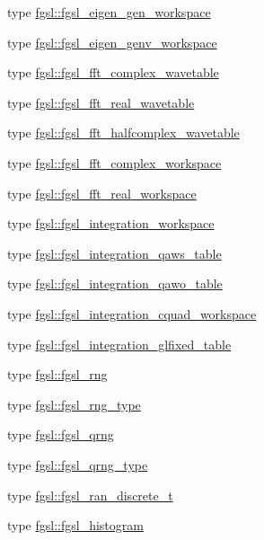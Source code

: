 \begin{DoxyCompactItemize}
\item 
type \hyperlink{structfgsl_1_1fgsl__eigen__gen__workspace}{fgsl\-::fgsl\-\_\-eigen\-\_\-gen\-\_\-workspace}
\item 
type \hyperlink{structfgsl_1_1fgsl__eigen__genv__workspace}{fgsl\-::fgsl\-\_\-eigen\-\_\-genv\-\_\-workspace}
\item 
type \hyperlink{structfgsl_1_1fgsl__fft__complex__wavetable}{fgsl\-::fgsl\-\_\-fft\-\_\-complex\-\_\-wavetable}
\item 
type \hyperlink{structfgsl_1_1fgsl__fft__real__wavetable}{fgsl\-::fgsl\-\_\-fft\-\_\-real\-\_\-wavetable}
\item 
type \hyperlink{structfgsl_1_1fgsl__fft__halfcomplex__wavetable}{fgsl\-::fgsl\-\_\-fft\-\_\-halfcomplex\-\_\-wavetable}
\item 
type \hyperlink{structfgsl_1_1fgsl__fft__complex__workspace}{fgsl\-::fgsl\-\_\-fft\-\_\-complex\-\_\-workspace}
\item 
type \hyperlink{structfgsl_1_1fgsl__fft__real__workspace}{fgsl\-::fgsl\-\_\-fft\-\_\-real\-\_\-workspace}
\item 
type \hyperlink{structfgsl_1_1fgsl__integration__workspace}{fgsl\-::fgsl\-\_\-integration\-\_\-workspace}
\item 
type \hyperlink{structfgsl_1_1fgsl__integration__qaws__table}{fgsl\-::fgsl\-\_\-integration\-\_\-qaws\-\_\-table}
\item 
type \hyperlink{structfgsl_1_1fgsl__integration__qawo__table}{fgsl\-::fgsl\-\_\-integration\-\_\-qawo\-\_\-table}
\item 
type \hyperlink{structfgsl_1_1fgsl__integration__cquad__workspace}{fgsl\-::fgsl\-\_\-integration\-\_\-cquad\-\_\-workspace}
\item 
type \hyperlink{structfgsl_1_1fgsl__integration__glfixed__table}{fgsl\-::fgsl\-\_\-integration\-\_\-glfixed\-\_\-table}
\item 
type \hyperlink{structfgsl_1_1fgsl__rng}{fgsl\-::fgsl\-\_\-rng}
\item 
type \hyperlink{structfgsl_1_1fgsl__rng__type}{fgsl\-::fgsl\-\_\-rng\-\_\-type}
\item 
type \hyperlink{structfgsl_1_1fgsl__qrng}{fgsl\-::fgsl\-\_\-qrng}
\item 
type \hyperlink{structfgsl_1_1fgsl__qrng__type}{fgsl\-::fgsl\-\_\-qrng\-\_\-type}
\item 
type \hyperlink{structfgsl_1_1fgsl__ran__discrete__t}{fgsl\-::fgsl\-\_\-ran\-\_\-discrete\-\_\-t}
\item 
type \hyperlink{structfgsl_1_1fgsl__histogram}{fgsl\-::fgsl\-\_\-histogram}

\end{DoxyCompactItemize}
